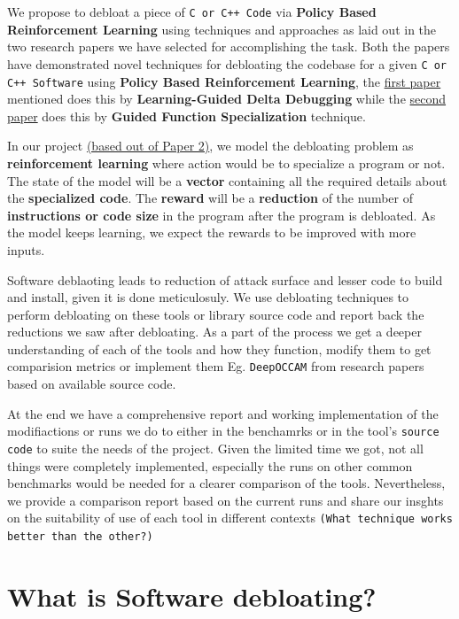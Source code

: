 \documentclass{relatorio}
\begin{document}
We propose to debloat a piece of \texttt{C or C++ Code} via \textbf{Policy Based Reinforcement Learning} using techniques and approaches as laid out in the two research papers we have selected for accomplishing the task. Both the papers have demonstrated novel techniques for debloating the codebase for a given \texttt{C or C++ Software} using \textbf{Policy Based Reinforcement Learning}, the \href{https://dl.acm.org/doi/10.1145/3243734.3243838}{first paper} mentioned does this by \textbf{Learning-Guided Delta Debugging}  while the \href{http://www.csl.sri.com/users/gehani/papers/MLSys-2019.DeepOCCAM.pdf}{second paper} does this by \textbf{Guided Function Specialization} technique. 

In our project \href{http://www.csl.sri.com/users/gehani/papers/MLSys-2019.DeepOCCAM.pdf}{(based out of Paper 2)}, we model the debloating problem as \textbf{reinforcement learning} where action would be to specialize a program or not. The state of the model will be a \textbf{vector} containing all the required details about the \textbf{specialized code}. The \textbf{reward} will be a \textbf{reduction} of the number of \textbf{instructions or code size} in the program after the program is debloated. As the model keeps learning, we expect the rewards to be improved with more inputs. 

Software deblaoting leads to reduction of attack surface and lesser code to build and install, given it is done meticulosuly. We use debloating 
techniques to perform debloating on these tools or library source code and report back the reductions we saw after debloating. As a part of the process
we get a deeper understanding of each of the tools and  how they function, modify them to get comparision metrics or implement them Eg. \texttt{DeepOCCAM} 
from research papers based on available source code. 

At the end we have a comprehensive report and working implementation of the modifiactions or runs we do to either in the benchamrks or in the tool's 
\texttt{source code} to suite the needs of the project. Given the limited time we got, not all things were completely implemented, especially the runs on other common
benchmarks would be needed for a clearer comparison of the tools. Nevertheless, we provide a comparison report based on the current runs and share our insghts on the suitability
of use of each tool in different contexts \texttt{(What technique works better than the other?)} 

\section{What is Software debloating?}%
\end{document}
